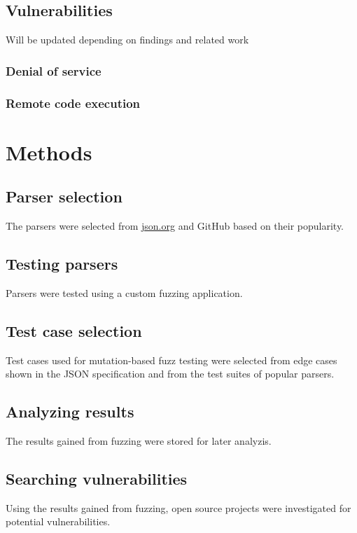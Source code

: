 \documentclass[english, 12pt, a4paper, sci, utf8, a-2b, online]{aaltothesis}
\def\note#1{\begin{flushleft}
	{\color{orange} \raggedright \textsf{#1}}
 \linebreak \noindent
\end{flushleft}}
\begin{document}
\subsection{Vulnerabilities}
\note{Will be updated depending on findings and related work}
\subsubsection{Denial of service}
\subsubsection{Remote code execution}


\clearpage
\section{Methods}


\subsection{Parser selection}
The parsers were selected from \url{json.org} and GitHub based on their popularity.


\subsection{Testing parsers}
Parsers were tested using a custom fuzzing application.


\subsection{Test case selection}
Test cases used for mutation-based fuzz testing were selected from edge cases shown in the JSON specification and from the test suites of popular parsers.


\subsection{Analyzing results}
The results gained from fuzzing were stored for later analyzis.


\subsection{Searching vulnerabilities}
Using the results gained from fuzzing, open source projects were investigated for potential vulnerabilities.


\clearpage
\end{document}
